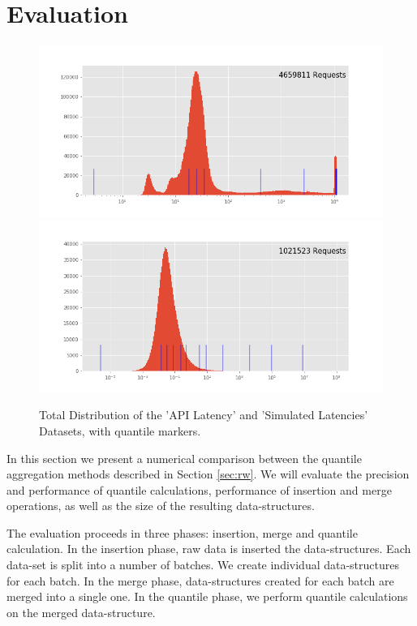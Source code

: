 \documentclass{article}
\theoremstyle{plain}
\theoremstyle{remark}
\begin{document}
\section{Evaluation}
\label{sec:eval}

\begin{figure}
   \includegraphics[width=\textwidth/2]{evaluation/images/dist_API_Latencies.png}
   \includegraphics[width=\textwidth/2]{evaluation/images/dist_Simulated_Latencies.png}
   \caption{Total Distribution of the 'API Latency' and 'Simulated Latencies' Datasets, with quantile markers.}
   \label{fig:ds}
\end{figure}

In this section we present a numerical comparison between the quantile aggregation methods described
in Section \ref{sec:rw}. We will evaluate the precision and performance of quantile calculations,
performance of insertion and merge operations, as well as the size of the resulting data-structures.

The evaluation proceeds in three phases: insertion, merge and quantile calculation. In the insertion
phase, raw data is inserted the data-structures. Each data-set is split into a number of batches. We
create individual data-structures for each batch. In the merge phase, data-structures created for
each batch are merged into a single one.  In the quantile phase, we perform quantile calculations on
the merged data-structure.
\end{document}
